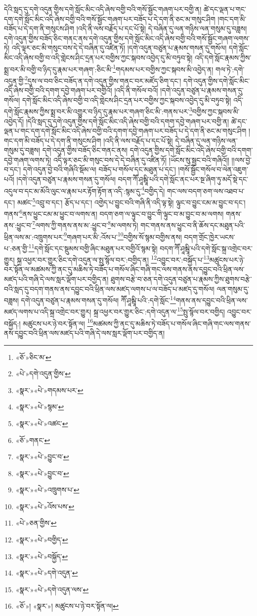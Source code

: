 དེའི་སླད་དུ་དགེ་འདུན་གྱིས་དགེ་སློང་མིང་འདི་ཞེས་བགྱི་བའི་གསོ་སྦྱོང་གཞག་པར་བགྱི་ན། ཚེ་དང་ལྡན་པ་གང་དག་དགེ་སློང་མིང་འདི་ཞེས་བགྱི་བའི་གསོ་སྦྱོང་གཞག་པར་བཟོད་པ་དེ་དག་ནི་ཅང་མ་གསུང་ཤིག །གང་དག་མི་བཟོད་པ་དེ་དག་ནི་གསུངས་ཤིག །འདི་ནི་ལས་བརྗོད་པ་དང་པོ་སྟེ། དེ་བཞིན་དུ་ལན་གཉིས་ལན་གསུམ་དུ་བཟླས། དགེ་འདུན་གྱིས་བཟོད་ཅིང་གནང་ནས་དགེ་འདུན་གྱིས་དགེ་སློང་མིང་འདི་ཞེས་བགྱི་བའི་གསོ་སྦྱོང་གཞག་ལགས་ཏེ། འདི་ལྟར་ཅང་མི་གསུང་བས་དེ་དེ་བཞིན་དུ་འཛིན་ཏོ། །དགེ་འདུན་བཙུན་པ་རྣམས་གསན་དུ་གསོལ། དགེ་སློང་མིང་འདི་ཞེས་བགྱི་བ་འདི་གླེངས་ཤིང་དྲན་པར་བགྱིས་ཀྱང་སྐབས་འབྱེད་དུ་མི་བཏུབ་སྟེ། འདི་དགེ་སློང་རྣམས་ཀྱིས་སྨྲ་བར་མི་བགྱི་བ་ཉིད་དུ་རྣམ་པར་གཞག་:ཅིང་མི་\footnote{«ཅོ་»ཅིང་མ་}གདམས་པར་བགྱིས་ཀྱང་སྐབས་མི་འབྱེད་ན། གལ་ཏེ་:དགེ་འདུན་གྱི་\footnote{«པེ་»དགེ་འདུན་གྱིས་}དུས་ལ་བབ་ཅིང་བཟོད་ན་དགེ་འདུན་གྱིས་གནང་བར་མཛོད་ཅིག་དང་། དགེ་འདུན་གྱིས་དགེ་སློང་མིང་འདི་ཞེས་བགྱི་བའི་དགག་དབྱེ་གཞག་པར་བགྱིའོ། །འདི་ནི་གསོལ་བའོ། །དགེ་འདུན་བཙུན་པ་རྣམས་གསན་དུ་གསོལ། དགེ་སློང་མིང་འདི་ཞེས་བགྱི་བ་འདི་གླེངས་ཤིང་དྲན་པར་བགྱིས་ཀྱང་སྐབས་འབྱེད་དུ་མི་བཏུབ་སྟེ། འདི་དགེ་སློང་རྣམས་ཀྱིས་སྨྲ་བར་མི་འགྱུར་བ་ཉིད་དུ་རྣམ་པར་གཞག་ཅིང་མི་:གནས་པར་\footnote{«སྣར་»«པེ་»གདམས་པར་}བགྱིས་ཀྱང་སྐབས་མི་འབྱེད་དོ། །དེའི་སླད་དུ་དགེ་འདུན་གྱིས་དགེ་སློང་མིང་འདི་ཞེས་བགྱི་བའི་དགག་དབྱེ་གཞག་པར་བགྱི་ན། ཚེ་དང་ལྡན་པ་གང་དག་དགེ་སློང་མིང་འདི་ཞེས་བགྱི་བའི་དགག་དབྱེ་གཞག་པར་བཟོད་པ་དེ་དག་ནི་ཅང་མ་གསུང་ཤིག །གང་དག་མི་བཟོད་པ་དེ་དག་ནི་གསུངས་ཤིག །འདི་ནི་ལས་བརྗོད་པ་དང་པོ་སྟེ། དེ་བཞིན་དུ་ལན་གཉིས་ལན་གསུམ་དུ་བཟླས། དགེ་འདུན་གྱིས་བཟོད་ཅིང་གནང་ནས། དགེ་འདུན་གྱིས་དགེ་སློང་མིང་འདི་ཞེས་བགྱི་བའི་དགག་དབྱེ་གཞག་ལགས་ཏེ། འདི་ལྟར་ཅང་མི་གསུང་བས་དེ་དེ་བཞིན་དུ་འཛིན་ཏོ། །ཡོངས་སུ་སྦྱང་བའི་གཞིའོ།། །།ལས་བྱེ་བ་དང་། དགེ་འདུན་བྱེ་བའི་གཞིའི་སྡོམ་ལ། བཟོད་པ་གསོལ་དང་མཐུན་པ་དང་། །གསོ་སྦྱོང་གསོལ་བ་ལེན་འཇུག་པའོ། །དགེ་འདུན་བཙུན་པ་རྣམས་གསན་དུ་གསོལ། བདག་ཀཽ་ཤཱམྦཱི་པའི་དགེ་སློང་ནང་པར་སྔ་ཞིག་ཏུ་མདོ་སྡེ་དང་འདུལ་བ་དང་མ་མོའི་ལུང་ལ་རྣམ་པར་རྟོག་རྟོག་ན་འདི་:སྙམ་དུ་\footnote{«སྣར་»«པེ་»སྙམ་}བགྱིད་དེ། གང་ལས་བདག་ཅག་ལས་འཐབ་པ་དང་། མཚང་\footnote{«སྣར་»«པེ་»འཚང་}འབྲུ་བ་དང་། རྩོད་པ་དང་། འགྱེད་པ་བྱུང་བའི་གཞི་ནི་འདི་ལྟ་སྟེ། ལྟུང་བ་བྱུང་ངམ་མ་བྱུང་བ་དང་། གནས་\footnote{«ཅོ་»གནང་}ནས་ཕྱུང་ངམ་མ་ཕྱུང་བ་ལགས་ན། བདག་ཅག་ལ་ལྟུང་བ་བྱུང་གི་ལྟུང་བ་མ་བྱུང་བ་མ་ལགས། གནས་ནས་:ཕྱུང་བ་\footnote{«སྣར་»«པེ་»བྱུང་བ་}ལགས་ཀྱི་གནས་ནས་མ་:ཕྱུང་བ་\footnote{«སྣར་»«པེ་»བྱུང་བ་}མ་ལགས་ཏེ། གང་གནས་ནས་ཕྱུང་བ་ནི་ཆོས་དང་མཐུན་པའི་ཕྲིན་ལས་མ་:འཁྲུགས་པར་\footnote{«སྣར་»«པེ་»འཁྲུགས་པ་}གཞག་པར་མི་:འོས་པ་\footnote{«སྣར་»«པེ་»འོས་པས་}བགྱིས་སོ་སྙམ་བགྱིས་ནས། བདག་གྲོང་ཁྱེར་ཡངས་པ་:ཅན་གྱི་\footnote{«པེ་»ཅན་གྱིས་}དགེ་སློང་དང་སྡུམས་བགྱི་ཞིང་མཐུན་པར་བགྱིའོ་སྙམ་སྟེ། བདག་ཀཽ་ཤཱམྦཱི་པའི་དགེ་སློང་སྐྲ་འགྲེང་བར་གྱུར། སྐྲ་འཕྱར་བར་གྱུར་ཅིང་དགེ་འདུན་ལ་སྤུ་སྙོལ་བར་:བགྱིད་ན། \footnote{«སྣར་»«པེ་»བགྱིད་}འབྱུང་བར་:བསྐྱོད་པ་\footnote{«སྣར་»«པེ་»བསྐྱོད་}མཚུངས་པར་ཉེ་བར་སྟོན་ལ་མཚམས་ཀྱི་ནང་དུ་མཆིས་ཏེ་བཟོད་པ་གསོལ་ཞིང་གཞི་གང་ལས་གནས་ནས་དབྱུང་བའི་ཕྲིན་ལས་མཛད་པའི་གཞི་དེ་ལས་སླར་ལྡོག་པར་བགྱིད་ན། ཐུགས་བརྩེ་བ་ཅན་དགེ་འདུན་བཙུན་པ་རྣམས་ཀྱིས་ཐུགས་བརྩེ་བའི་སླད་དུ་བདག་གནས་ནས་དབྱུང་བའི་ཕྲིན་ལས་མཛད་ལགས་པ་ལ་བཟོད་པ་མཛད་དུ་གསོལ། ལན་གསུམ་དུ་བཟླས། དགེ་འདུན་བཙུན་པ་རྣམས་གསན་དུ་གསོལ། ཀཽ་ཤཱམྦཱི་པའི་:དགེ་སློང་\footnote{«སྣར་»«པེ་»དགེ་འདུན་}གནས་ནས་དབྱུང་བའི་ཕྲིན་ལས་མཛད་ལགས་པ་འདི་སྐྲ་འགྲེང་བར་གྱུར། སྐྲ་འཕྱར་བར་གྱུར་ཅིང་:དགེ་འདུན་ལ་\footnote{«སྣར་»«པེ་»དགེ་འདུན་ལས་}སྤུ་སྙོལ་བར་བགྱིད། འབྱུང་བར་བསྐྱོད:། མཚུངས་པར་ཉེ་བར་སྟོན་ལ། \footnote{«ཅོ་»།  «སྣར་»། མཚུངས་པ་ཉེ་བར་སྟོན་ལ། }མཚམས་ཀྱི་ནང་དུ་མཆིས་ཏེ་བཟོད་པ་གསོལ་ཞིང་གཞི་གང་ལས་གནས་ནས་དབྱུང་བའི་ཕྲིན་ལས་མཛད་པའི་གཞི་དེ་ལས་སླར་ལྡོག་པར་བགྱིད་ན། 